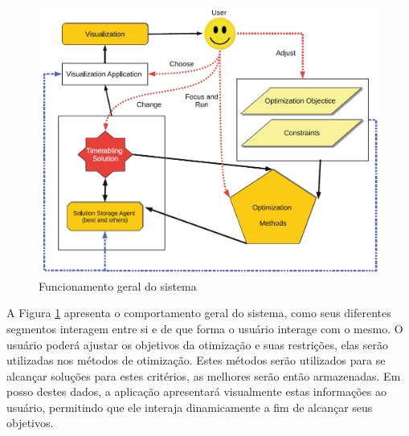         \begin{figure}[htbp]\centering
            \caption{\label{fig:sistema} Funcionamento geral do sistema}
            \includegraphics[scale=0.6]{files/img/Arquitetura/Arquitetura_bebis_information_2019.png}
        \end{figure}

        A Figura \ref{fig:sistema} apresenta o comportamento geral do sistema, como seus diferentes segmentos interagem entre si e de que forma o usuário interage com o mesmo. O usuário poderá ajustar os objetivos da otimização e suas restrições, elas serão utilizadas nos métodos de otimização. Estes métodos serão utilizados para se alcançar soluções para estes critérios, as melhores serão então armazenadas. Em posso destes dados, a aplicação apresentará visualmente estas informações ao usuário, permitindo que ele interaja dinamicamente a fim de alcançar seus objetivos.
